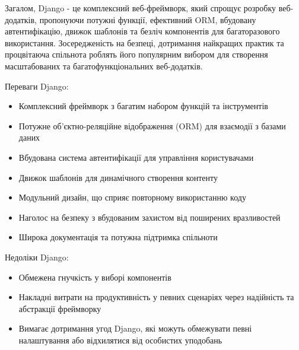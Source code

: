 Загалом, Django - це комплексний веб-фреймворк, який спрощує розробку веб-додатків, пропонуючи потужні функції, ефективний ORM, вбудовану автентифікацію, движок шаблонів та безліч компонентів для багаторазового використання. Зосередженість на безпеці, дотримання найкращих практик та процвітаюча спільнота роблять його популярним вибором для створення масштабованих та багатофункціональних веб-додатків.


Переваги Django:
\begin{itemize}
\item Комплексний фреймворк з багатим набором функцій та інструментів
\item Потужне об'єктно-реляційне відображення (ORM) для взаємодії з базами даних
\item Вбудована система автентифікації для управління користувачами
\item Движок шаблонів для динамічного створення контенту
\item Модульний дизайн, що сприяє повторному використанню коду
\item Наголос на безпеку з вбудованим захистом від поширених вразливостей
\item Широка документація та потужна підтримка спільноти
\end{itemize}

Недоліки Django:
\begin{itemize}
\item Обмежена гнучкість у виборі компонентів
\item Накладні витрати на продуктивність у певних сценаріях через надійність та абстракції фреймворку
\item Вимагає дотримання угод Django, які можуть обмежувати певні налаштування або відхилятися від особистих уподобань
\end{itemize}